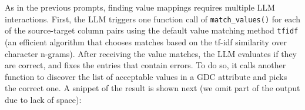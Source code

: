 \noindent
As in the previous prompts, finding value mappings requires multiple LLM interactions. First, the LLM triggers one function call of \texttt{match\_values()} for each of the source-target column pairs using the default value matching method \texttt{tfidf}  (an efficient algorithm that chooses matches based on the tf-idf similarity over character n-grams). After receiving the value matches, the LLM evaluates if they are correct, and fixes the entries that contain errors. To do so, it calls another function to discover the list of acceptable values in a GDC attribute and picks the correct one. A snippet of the result is shown next (we omit part of the output due to lack of space):

